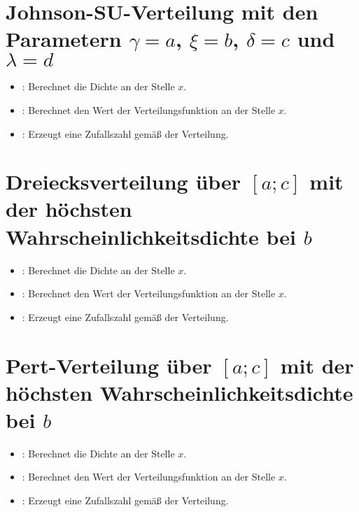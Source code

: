 \section{Johnson-SU-Verteilung mit den Parametern \texorpdfstring{$\gamma=a$}{a}, \texorpdfstring{$\xi=b$}{b}, \texorpdfstring{$\delta=c$}{c} und \texorpdfstring{$\lambda=d$}{d}}

\begin{itemize}

\item
{}:
Berechnet die Dichte an der Stelle $x$.

\item
{}:
Berechnet den Wert der Verteilungsfunktion an der Stelle $x$.

\item
{}:
Erzeugt eine Zufallszahl gemäß der Verteilung.  

\end{itemize}



\section{Dreiecksverteilung über \texorpdfstring{$[a;c]$}{[a;c]} mit der höchsten Wahrscheinlichkeitsdichte bei \texorpdfstring{$b$}{b}}

\begin{itemize}

\item
{}:
Berechnet die Dichte an der Stelle $x$.

\item
{}:
Berechnet den Wert der Verteilungsfunktion an der Stelle $x$.

\item
{}:
Erzeugt eine Zufallszahl gemäß der Verteilung.

\end{itemize}



\section{Pert-Verteilung über \texorpdfstring{$[a;c]$}{[a;c]} mit der höchsten Wahrscheinlichkeitsdichte bei \texorpdfstring{$b$}{b}}

\begin{itemize}

\item
{}:
Berechnet die Dichte an der Stelle $x$.

\item
{}:
Berechnet den Wert der Verteilungsfunktion an der Stelle $x$.

\item
{}:
Erzeugt eine Zufallszahl gemäß der Verteilung.

\end{itemize}



